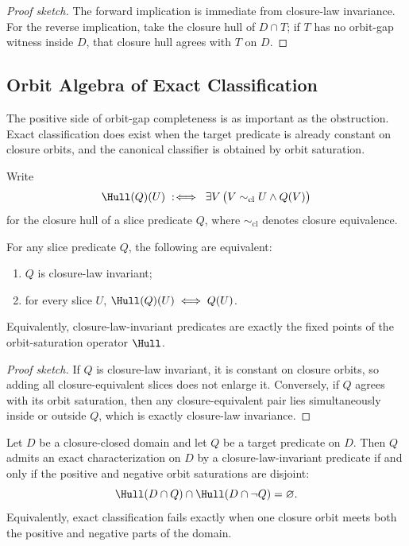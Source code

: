 \begin{proof}[Proof sketch]
The forward implication is immediate from closure-law invariance. For the reverse implication, take the closure hull of $D \cap T$; if $T$ has no orbit-gap witness inside $D$, that closure hull agrees with $T$ on $D$.
\end{proof}

\subsection*{Orbit Algebra of Exact Classification}

The positive side of orbit-gap completeness is as important as the obstruction. Exact classification does exist when the target predicate is already constant on closure orbits, and the canonical classifier is obtained by orbit saturation.

Write
\[
\Hull(Q)(U) \;:\!\iff\; \exists V\,\bigl(V \sim_{\mathrm{cl}} U \land Q(V)\bigr)
\]
for the closure hull of a slice predicate $Q$, where $\sim_{\mathrm{cl}}$ denotes closure equivalence.

\begin{proposition}\label{prop:closurehull-fixed-points}
For any slice predicate $Q$, the following are equivalent:
\begin{enumerate}
\item $Q$ is closure-law invariant;
\item for every slice $U$, $\Hull(Q)(U) \iff Q(U)$.
\end{enumerate}
Equivalently, closure-law-invariant predicates are exactly the fixed points of the orbit-saturation operator $\Hull$.
\end{proposition}

\begin{proof}[Proof sketch]
If $Q$ is closure-law invariant, it is constant on closure orbits, so adding all closure-equivalent slices does not enlarge it. Conversely, if $Q$ agrees with its orbit saturation, then any closure-equivalent pair lies simultaneously inside or outside $Q$, which is exactly closure-law invariance.
\end{proof}

\begin{theorem}\label{thm:exact-classification-hull-separation}
Let $D$ be a closure-closed domain and let $Q$ be a target predicate on $D$. Then $Q$ admits an exact characterization on $D$ by a closure-law-invariant predicate if and only if the positive and negative orbit saturations are disjoint:
\[
\Hull(D \cap Q) \cap \Hull(D \cap \neg Q) = \varnothing.
\]
Equivalently, exact classification fails exactly when one closure orbit meets both the positive and negative parts of the domain.
\end{theorem}

